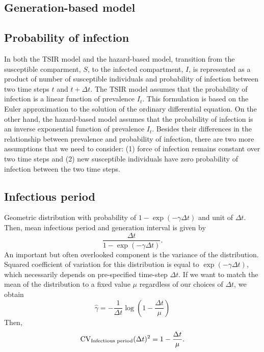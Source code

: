 \documentclass{article}
\begin{document}
\subsection{Generation-based model}





\subsection{Probability of infection}

In both the TSIR model and the hazard-based model, transition from the susceptible comparment, $S$, to the infected compartment, $I$, is represented as a product of number of susceptible individuals and probability of infection between two time steps $t$ and $t + \Delta t$.
The TSIR model assumes that the probability of infection is a linear function of prevalence $I_t$.
This formulation is based on the Euler approximation to the solution of the ordinary differential equation.
On the other hand, the hazard-based model assumes that the probability of infection is an inverse exponential function of prevalence $I_t$.
Besides their differences in the relationship between prevalence and probability of infection, there are two more assumptions that we need to consider: (1) force of infection remains constant over two time steps and (2) new susceptible individuals have zero probability of infection between the two time steps.



\subsection{Infectious period}

Geometric distribution with probability of $1-\exp(-\gamma \Delta t)$ and unit of $\Delta t$.
Then, mean infectious period and generation interval is given by 
\begin{equation}
\frac{\Delta t}{1-\exp(-\gamma \Delta t)}.
\end{equation}
An important but often overlooked component is the variance of the distribution.
Squared coefficient of variation for this distribution is equal to $\exp(-\gamma \Delta t)$, which necessarily depends on pre-specified time-step $\Delta t$.
If we want to match the mean of the distribution to a fixed value $\mu$ regardless of our choices of $\Delta t$, we obtain 
\begin{equation}
\hat \gamma = - \frac{1}{\Delta t} \log\left(1 - \frac{\Delta t}{\mu}\right)
\end{equation}
Then,
\begin{equation}
\mathrm{CV}_{\tiny\textrm{Infectious period}}(\Delta t)^2 = 1 - \frac{\Delta t}{\mu}.
\end{equation}
\end{document}
